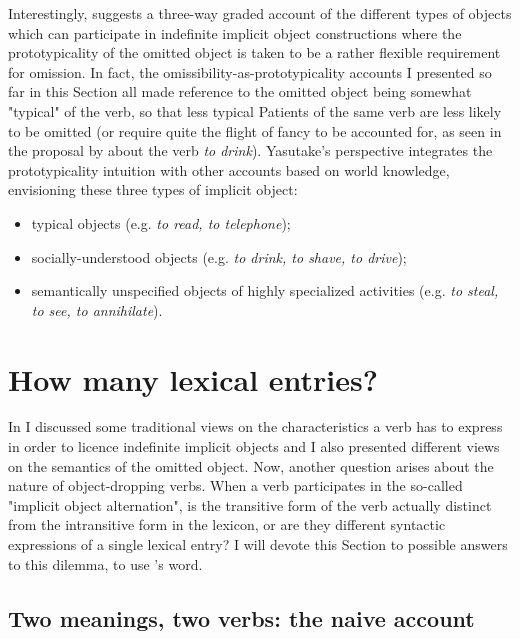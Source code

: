 Interestingly, \textcite[48-50]{Yasutake1987} suggests a three-way graded account of the different types of objects which can participate in indefinite implicit object constructions where the prototypicality of the omitted object is taken to be a rather flexible requirement for omission. In fact, the omissibility-as-prototypicality accounts I presented so far in this Section all made reference to the omitted object being somewhat "typical" of the verb, so that less typical Patients of the same verb are less likely to be omitted (or require quite the flight of fancy to be accounted for, as seen in the proposal by \textcite{HuddlestonEtAl2002} about the verb \textit{to drink}). Yasutake's perspective integrates the prototypicality intuition with other accounts based on world knowledge, envisioning these three types of implicit object:
\begin{itemize}
    \item typical objects (e.g. \textit{to read, to telephone});
    \item socially-understood objects (e.g. \textit{to drink, to shave, to drive});
    \item semantically unspecified objects of highly specialized activities (e.g. \textit{to steal, to see, to annihilate}).
\end{itemize}


\section{How many lexical entries?} 

In  I discussed some traditional views on the characteristics a verb has to express in order to licence indefinite implicit objects and I also presented different views on the semantics of the omitted object. Now, another question arises about the nature of object-dropping verbs. When a verb participates in the so-called "implicit object alternation", is the transitive form of the verb actually distinct from the intransitive form in the lexicon, or are they different syntactic expressions of a single lexical entry? I will devote this Section to possible answers to this dilemma, to use \textcite{Gillon2012}'s word.


\subsection{Two meanings, two verbs: the naive account} 

